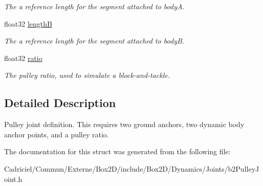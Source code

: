 \begin{DoxyCompactItemize}
\begin{DoxyCompactList}\small\item\em The a reference length for the segment attached to bodyA. \end{DoxyCompactList}\item 
float32 \hyperlink{structb2_pulley_joint_def_a5857d5b5b9880b6c8201ce3ee8c3eef0}{lengthB}\hypertarget{structb2_pulley_joint_def_a5857d5b5b9880b6c8201ce3ee8c3eef0}{}\label{structb2_pulley_joint_def_a5857d5b5b9880b6c8201ce3ee8c3eef0}

\begin{DoxyCompactList}\small\item\em The a reference length for the segment attached to bodyB. \end{DoxyCompactList}\item 
float32 \hyperlink{structb2_pulley_joint_def_af35074246aeacbf239c11682642b31f5}{ratio}\hypertarget{structb2_pulley_joint_def_af35074246aeacbf239c11682642b31f5}{}\label{structb2_pulley_joint_def_af35074246aeacbf239c11682642b31f5}

\begin{DoxyCompactList}\small\item\em The pulley ratio, used to simulate a block-\/and-\/tackle. \end{DoxyCompactList}\end{DoxyCompactItemize}


\subsection{Detailed Description}
Pulley joint definition. This requires two ground anchors, two dynamic body anchor points, and a pulley ratio. 

The documentation for this struct was generated from the following file\+:\begin{DoxyCompactItemize}
\item 
Cadriciel/\+Commun/\+Externe/\+Box2\+D/include/\+Box2\+D/\+Dynamics/\+Joints/b2\+Pulley\+Joint.\+h\end{DoxyCompactItemize}
